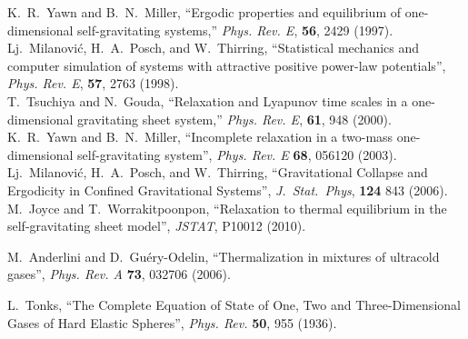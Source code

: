 \documentclass[a4paper, onecolumn]{revtex4-1}
\begin{document}
\begin{thebibliography}{1}
K.~R.~Yawn and B.~N.~Miller, ``Ergodic properties and equilibrium of
  one-dimensional self-gravitating systems,'' {\em Phys. Rev. E}, {\bf 56}, 2429 (1997).
%
\\ 
%
Lj.~Milanovi\'c, H.~A.~Posch, and W.~Thirring, 
``Statistical mechanics and computer simulation of systems with attractive positive power-law
potentials'', 
{\em Phys. Rev. E}, {\bf 57}, 2763 (1998). 
%
\\ 
%
T.~Tsuchiya and N.~Gouda, ``Relaxation and Lyapunov time scales in a
  one-dimensional gravitating sheet system,'' {\em Phys. Rev. E}, {\bf 61}, 948 (2000).
%
\\
%
K.~R.~Yawn and B.~N.~Miller, 
``Incomplete relaxation in a two-mass one-dimensional self-gravitating system'', 
{\em Phys. Rev. E} {\bf 68}, 056120  (2003).
%
\\
%
Lj.~Milanovi\'c, H.~A.~Posch, and W.~Thirring, 
``Gravitational Collapse and Ergodicity in Confined Gravitational Systems'', 
{\em J.~Stat.~Phys},  {\bf 124} 843 (2006).
%
\\
%
M.~Joyce and T.~Worrakitpoonpon, 
``Relaxation to thermal equilibrium in the self-gravitating sheet model'', 
{\em JSTAT}, P10012 (2010).  



 M.~Anderlini and D.~Gu\'ery-Odelin, ``Thermalization in
  mixtures of ultracold gases'', {\em Phys. Rev. A} {\bf 73}, 032706 (2006).


L.~Tonks, 
``The Complete Equation of State of One, Two and Three-Dimensional Gases of Hard Elastic Spheres'', 
{\em Phys. Rev.} {\bf 50}, 955 (1936). 
  



\end{thebibliography}




 
\end{document}
